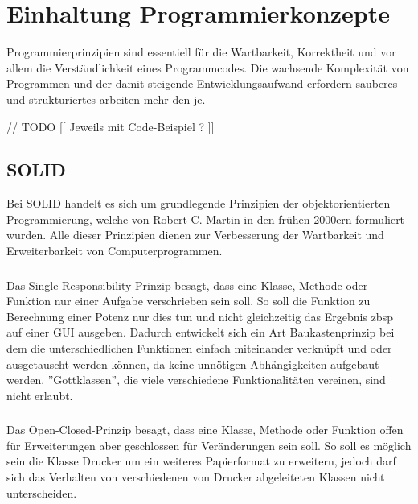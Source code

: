
\section{Einhaltung Programmierkonzepte}

Programmierprinzipien sind essentiell für die Wartbarkeit, Korrektheit und vor allem die Verständlichkeit eines Programmcodes. Die wachsende Komplexität von Programmen und der damit steigende Entwicklungsaufwand erfordern sauberes und strukturiertes arbeiten mehr den je. 


// TODO [[ Jeweils mit Code-Beispiel ? ]]

\subsection{SOLID}
Bei SOLID handelt es sich um grundlegende Prinzipien der objektorientierten Programmierung, welche von Robert C. Martin in den frühen 2000ern formuliert wurden.  Alle dieser Prinzipien dienen zur Verbesserung der Wartbarkeit und Erweiterbarkeit von Computerprogrammen. 



\subsubsection{\textPrincipleSingleResponsibility}
\label{\textPrincipleSingleResponsibility}
Das Single-Responsibility-Prinzip besagt, dass eine Klasse, Methode oder Funktion
nur einer Aufgabe verschrieben sein soll. So soll die Funktion zu Berechnung einer
Potenz nur dies tun und nicht gleichzeitig das Ergebnis zbsp auf einer GUI ausgeben.
Dadurch entwickelt sich ein Art Baukastenprinzip bei dem die unterschiedlichen 
Funktionen einfach miteinander verknüpft und oder ausgetauscht werden können, da
keine unnötigen Abhängigkeiten aufgebaut werden. ''Gottklassen'', die viele
verschiedene Funktionalitäten vereinen, sind nicht erlaubt.

\subsubsection{\textPrincipleOpenClosed}
\label{\textPrincipleOpenClosed}
Das Open-Closed-Prinzip besagt, dass eine Klasse, Methode oder Funktion offen
für Erweiterungen aber geschlossen für Veränderungen sein soll. So soll es möglich
sein die Klasse Drucker um ein weiteres Papierformat zu erweitern, jedoch darf sich
das Verhalten von verschiedenen von Drucker abgeleiteten Klassen nicht unterscheiden.

